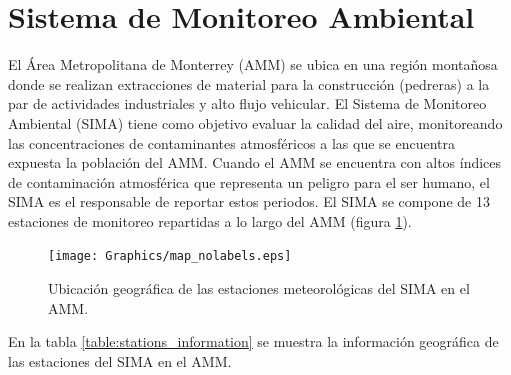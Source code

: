\section{Sistema de Monitoreo Ambiental}
El Área Metropolitana de Monterrey (AMM) se ubica en una región montañosa donde se realizan extracciones de material para la construcción (pedreras) a la par de actividades industriales y alto flujo vehicular. El Sistema de Monitoreo Ambiental (SIMA) tiene como objetivo evaluar la calidad del aire, monitoreando las concentraciones de contaminantes atmosféricos a las que se encuentra expuesta la población del AMM. Cuando el AMM se encuentra con altos índices de contaminación atmosférica que representa un peligro para el ser humano, el SIMA es el responsable de reportar estos periodos. El SIMA se compone de 13 estaciones de monitoreo repartidas a lo largo del AMM (figura \ref{fig:stations}).
\begin{figure}[H]
	\centering
	\texttt{[image: Graphics/map\_nolabels.eps]}
	\caption{Ubicación geográfica de las estaciones meteorológicas del SIMA en el AMM.}
	\label{fig:stations}
\end{figure}
En la tabla \ref{table:stations_information} se muestra la información geográfica de las estaciones del SIMA en el AMM.
